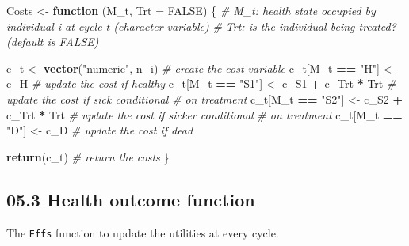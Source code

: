 \documentclass[
]{article}
\newenvironment{Shaded}{\begin{snugshade}}{\end{snugshade}}
\newcommand{\CommentTok}[1]{\textcolor[rgb]{0.56,0.35,0.01}{\textit{#1}}}
\newcommand{\ControlFlowTok}[1]{\textcolor[rgb]{0.13,0.29,0.53}{\textbf{#1}}}
\newcommand{\DataTypeTok}[1]{\textcolor[rgb]{0.13,0.29,0.53}{#1}}
\newcommand{\KeywordTok}[1]{\textcolor[rgb]{0.13,0.29,0.53}{\textbf{#1}}}
\newcommand{\NormalTok}[1]{#1}
\newcommand{\OperatorTok}[1]{\textcolor[rgb]{0.81,0.36,0.00}{\textbf{#1}}}
\newcommand{\OtherTok}[1]{\textcolor[rgb]{0.56,0.35,0.01}{#1}}
\newcommand{\StringTok}[1]{\textcolor[rgb]{0.31,0.60,0.02}{#1}}
\begin{document}
\begin{Shaded}
\begin{Highlighting}[]
\NormalTok{Costs <-}\StringTok{ }\ControlFlowTok{function}\NormalTok{ (M_t, }\DataTypeTok{Trt =} \OtherTok{FALSE}\NormalTok{) \{}
  \CommentTok{# M_t: health state occupied by individual i at cycle t (character variable)}
  \CommentTok{# Trt:  is the individual being treated? (default is FALSE) }
  
\NormalTok{  c_t <-}\StringTok{ }\KeywordTok{vector}\NormalTok{(}\StringTok{"numeric"}\NormalTok{, n_i)            }\CommentTok{# create the cost variable }
\NormalTok{  c_t[M_t }\OperatorTok{==}\StringTok{ "H"}\NormalTok{]  <-}\StringTok{ }\NormalTok{c_H                  }\CommentTok{# update the cost if healthy}
\NormalTok{  c_t[M_t }\OperatorTok{==}\StringTok{ "S1"}\NormalTok{] <-}\StringTok{ }\NormalTok{c_S1 }\OperatorTok{+}\StringTok{ }\NormalTok{c_Trt }\OperatorTok{*}\StringTok{ }\NormalTok{Trt   }\CommentTok{# update the cost if sick conditional }
                                           \CommentTok{# on treatment}
\NormalTok{  c_t[M_t }\OperatorTok{==}\StringTok{ "S2"}\NormalTok{] <-}\StringTok{ }\NormalTok{c_S2 }\OperatorTok{+}\StringTok{ }\NormalTok{c_Trt }\OperatorTok{*}\StringTok{ }\NormalTok{Trt   }\CommentTok{# update the cost if sicker conditional }
                                           \CommentTok{# on treatment}
\NormalTok{  c_t[M_t }\OperatorTok{==}\StringTok{ "D"}\NormalTok{]  <-}\StringTok{ }\NormalTok{c_D                  }\CommentTok{# update the cost if dead}
  
  \KeywordTok{return}\NormalTok{(c_t)                                  }\CommentTok{# return the costs}
\NormalTok{\}}
\end{Highlighting}
\end{Shaded}

\hypertarget{health-outcome-function}{%
\subsection{05.3 Health outcome
function}\label{health-outcome-function}}

The \texttt{Effs} function to update the utilities at every cycle.
\end{document}
